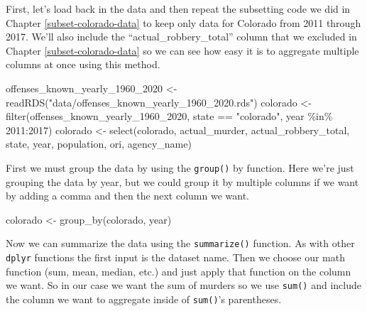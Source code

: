 \documentclass[
]{krantz}
\makeatletter
\newenvironment{Shaded}{\begin{snugshade}}{\end{snugshade}}
\newcommand{\DecValTok}[1]{\textcolor[rgb]{0.06,0.06,0.06}{#1}}
\newcommand{\FunctionTok}[1]{\textcolor[rgb]{0,0,0}{#1}}
\newcommand{\NormalTok}[1]{#1}
\newcommand{\OtherTok}[1]{\textcolor[rgb]{0.37,0.37,0.37}{#1}}
\newcommand{\SpecialCharTok}[1]{\textcolor[rgb]{0,0,0}{#1}}
\newcommand{\StringTok}[1]{\textcolor[rgb]{0.5,0.5,0.5}{#1}}
\newenvironment{kframe}{%
\medskip{}
\setlength{\fboxsep}{.8em}
 \def\at@end@of@kframe{}%
 \ifinner\ifhmode%
  \def\at@end@of@kframe{\end{minipage}}%
  \begin{minipage}{\columnwidth}%
 \fi\fi%
 \def\FrameCommand##1{\hskip\@totalleftmargin \hskip-\fboxsep
 \colorbox{shadecolor}{##1}\hskip-\fboxsep
     \hskip-\linewidth \hskip-\@totalleftmargin \hskip\columnwidth}%
 \MakeFramed {\advance\hsize-\width
   \@totalleftmargin\z@ \linewidth\hsize
   \@setminipage}}%
 {\par\unskip\endMakeFramed%
 \at@end@of@kframe}
\renewenvironment{Shaded}{\begin{kframe}}{\end{kframe}}
\makeatother
\begin{document}
First, let's load back in the data and then repeat the subsetting code we did in Chapter \ref{subset-colorado-data} to keep only data for Colorado from 2011 through 2017. We'll also include the ``actual\_robbery\_total'' column that we excluded in Chapter \ref{subset-colorado-data} so we can see how easy it is to aggregate multiple columns at once using this method.

\begin{Shaded}
\begin{Highlighting}[]
\NormalTok{offenses\_known\_yearly\_1960\_2020 }\OtherTok{\textless{}{-}} \FunctionTok{readRDS}\NormalTok{(}\StringTok{"data/offenses\_known\_yearly\_1960\_2020.rds"}\NormalTok{)}
\NormalTok{colorado }\OtherTok{\textless{}{-}} \FunctionTok{filter}\NormalTok{(offenses\_known\_yearly\_1960\_2020, state }\SpecialCharTok{==} \StringTok{"colorado"}\NormalTok{, year }\SpecialCharTok{\%in\%} \DecValTok{2011}\SpecialCharTok{:}\DecValTok{2017}\NormalTok{)}
\NormalTok{colorado }\OtherTok{\textless{}{-}} \FunctionTok{select}\NormalTok{(colorado, actual\_murder, actual\_robbery\_total, state, year, population, ori, agency\_name)}
\end{Highlighting}
\end{Shaded}

First we must group the data by using the \texttt{group()} by function. Here we're just grouping the data by year, but we could group it by multiple columns if we want by adding a comma and then the next column we want.

\begin{Shaded}
\begin{Highlighting}[]
\NormalTok{colorado }\OtherTok{\textless{}{-}} \FunctionTok{group\_by}\NormalTok{(colorado, year)}
\end{Highlighting}
\end{Shaded}

Now we can summarize the data using the \texttt{summarize()} function. As with other \texttt{dplyr} functions the first input is the dataset name. Then we choose our math function (sum, mean, median, etc.) and just apply that function on the column we want. So in our case we want the sum of murders so we use \texttt{sum()} and include the column we want to aggregate inside of \texttt{sum()}'s parentheses.
\end{document}
